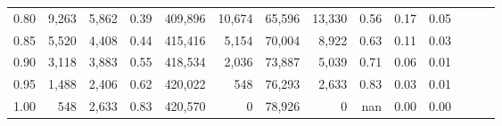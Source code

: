 \begin{tabular}{rrrrrrrrrrrrrr}
0.80 &   9,263 &  5,862 &  0.39 &  409,896 &   10,674 &  65,596 &  13,330 &  0.56 &  0.17 &      0.05 \\
0.85 &   5,520 &  4,408 &  0.44 &  415,416 &    5,154 &  70,004 &   8,922 &  0.63 &  0.11 &      0.03 \\
0.90 &   3,118 &  3,883 &  0.55 &  418,534 &    2,036 &  73,887 &   5,039 &  0.71 &  0.06 &      0.01 \\
0.95 &   1,488 &  2,406 &  0.62 &  420,022 &      548 &  76,293 &   2,633 &  0.83 &  0.03 &      0.01 \\
1.00 &     548 &  2,633 &  0.83 &  420,570 &        0 &  78,926 &       0 &   nan &  0.00 &      0.00 \\
\bottomrule
\end{tabular}
